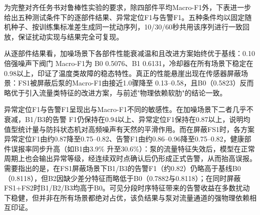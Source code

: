 \documentclass[12pt, a4paper]{ctexart}
\begin{document}
为完整对齐任务书对鲁棒性实验的要求，除四部件平均Macro-F1外，下表进一步给出五种测试条件下的逐部件结果、异常定位F1与告警F1。五种条件均以固定随机种子、按训练集标准差生成同一扰动序列，10/30/60秒共用该序列进行一致回放，保证扰动实现与结果完全可复现。

从逐部件结果看，加噪场景下各部件性能衰减温和且改进方案始终优于基线：0.10倍强噪声下阀门 Macro-F1为 B0 0.5076、B1 0.6131，冷却器在所有场景下稳定在0.98以上，印证了温度类故障的稳态特性。真正的性能悬崖出现在传感器屏蔽场景：FS1被屏蔽后泵的Macro-F1由接近1.0骤降至 0.13--0.58，且B0（0.5823）反而略优于引入流量类特征的改进方案，与前述"物理依赖软肋"的结论一致。

异常定位F1与告警F1呈现出与Macro-F1不同的敏感性。在加噪场景下二者几乎不衰减，B1/B3的告警 F1仍保持在0.94以上、异常定位F1保持在0.87以上，说明均值型统计量与防抖状态机对高频噪声有天然的平滑作用。而在屏蔽FS1时，各方案异常定位F1由约0.87降至0.75--0.82、告警F1由约0.86--0.96降至0.75--0.82，健康部件误报率同步升高（如B1由3.9\% 升至30.6\%）：泵的流量特征失效后，模型在正常周期上也会输出异常等级，经连续双时点确认后仍形成正式告警，从而抬高误报。需要指出的是，在FS1屏蔽场景下B1/B3的告警F1（约0.82）仍略高于基线B0（0.8118），但B2因缺少差分特征而略低于B0（0.7882与0.8118）；在同时屏蔽FS1+FS2时B1/B2/B3均高于B0。可见分段时序特征带来的告警收益在多数扰动下稳健，但并非在所有场景都绝对占优，该负结果与泵对流量通道的强物理依赖相互印证。
\end{document}
